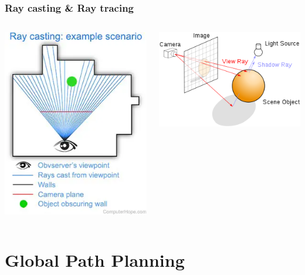 \documentclass[
    11pt, %
    aspectratio=169, %
]{beamer}
\begin{document}
\begin{frame}
    \frametitle{Ray casting \& Ray tracing}
    \begin{columns}[c]
        \begin{column}{0.5\textwidth}
            \begin{center}
                \includegraphics[scale=0.5]{assets/ray-casting-diagram.jpg}
            \end{center}
        \end{column}
        \begin{column}{0.5\textwidth}
            \begin{center}
                \includegraphics[scale=0.6]{assets/300px-Ray_trace_diagram.svg.png}
            \end{center}
        \end{column}
    \end{columns}
\end{frame}

\section{Global Path Planning}
\end{document}
